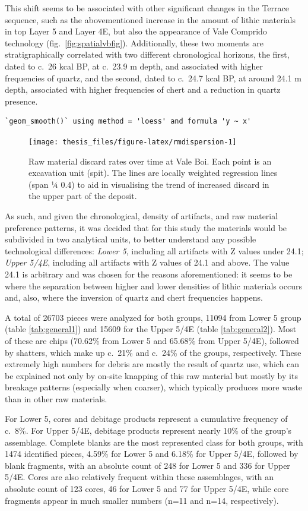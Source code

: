 \documentclass[12pt,twoside]{reedthesis}
\begin{document}
This shift seems to be associated with other significant changes in the Terrace sequence, such as the abovementioned increase in the amount of lithic materials in top Layer 5 and Layer 4E, but also the appearance of Vale Comprido technology (fig.~\ref{fig:spatialvbfig}). Additionally, these two moments are stratigraphically correlated with two different chronological horizons, the first, dated to c.~26 kcal BP, at c.~23.9 m depth, and associated with higher frequencies of quartz, and the second, dated to c.~24.7 kcal BP, at around 24.1 m depth, associated with higher frequencies of chert and a reduction in quartz presence.
\begin{verbatim}
`geom_smooth()` using method = 'loess' and formula 'y ~ x'
\end{verbatim}
\begin{figure}
\texttt{[image: thesis\_files/figure-latex/rmdispersion-1]} \caption{Raw material discard rates over time at Vale Boi. Each point is an excavation unit (spit). The lines are locally weighted regression lines (span ¼ 0.4) to aid in visualising the trend of increased discard in the upper part of the deposit.}\label{fig:rmdispersion}
\end{figure}
As such, and given the chronological, density of artifacts, and raw material preference patterns, it was decided that for this study the materials would be subdivided in two analytical units, to better understand any possible technological differences: \emph{Lower 5}, including all artifacts with Z values under 24.1; \emph{Upper 5/4E}, including all artifacts with Z values of 24.1 and above. The value 24.1 is arbitrary and was chosen for the reasons aforementioned: it seems to be where the separation between higher and lower densities of lithic materials occurs and, also, where the inversion of quartz and chert frequencies happens.

A total of 26703 pieces were analyzed for both groups, 11094 from Lower 5 group (table \ref{tab:general1}) and 15609 for the Upper 5/4E (table \ref{tab:general2}). Most of these are chips (70.62\% from Lower 5 and 65.68\% from Upper 5/4E), followed by shatters, which make up c.~21\% and c.~24\% of the groups, respectively. These extremely high numbers for debris are mostly the result of quartz use, which can be explained not only by on-site knapping of this raw material but mostly by its breakage patterns (especially when coarser), which typically produces more waste than in other raw materials.

For Lower 5, cores and debitage products represent a cumulative frequency of c.~8\%. For Upper 5/4E, debitage products represent nearly 10\% of the group's assemblage. Complete blanks are the most represented class for both groups, with 1474 identified pieces, 4.59\% for Lower 5 and 6.18\% for Upper 5/4E, followed by blank fragments, with an absolute count of 248 for Lower 5 and 336 for Upper 5/4E. Cores are also relatively frequent within these assemblages, with an absolute count of 123 cores, 46 for Lower 5 and 77 for Upper 5/4E, while core fragments appear in much smaller numbers (n=11 and n=14, respectively).
\end{document}
